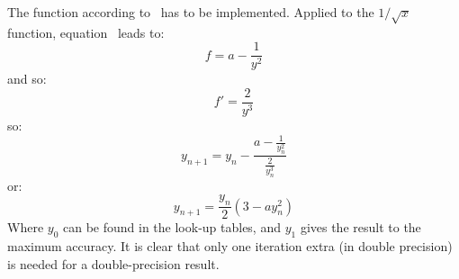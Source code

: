 The function according to~ has to be implemented. 
Applied to the $1/\sqrt{x}$ function, equation~ leads to:
\begin{equation}
f = a - \frac{1}{y^{2}}
\end{equation}
and so:
\begin{equation}
f' = \frac{2}{y^{3}}
\end{equation}
so:
\begin{equation}
y_{n+1} = y_{n} - \frac{ a - \frac{1}{y^{2}_{n}} }{ \frac{2}{y^{3}_{n}} }
\end{equation}
or:
\begin{equation}
y_{n+1} = \frac{y_{n}}{2} (3 - a y^{2}_{n})
\end{equation}
Where $y_{0}$ can be found in the look-up tables, and $y_{1}$ gives the result
to the maximum accuracy. 
It is clear that only one iteration extra (in double 
precision) is needed for a double-precision result.

